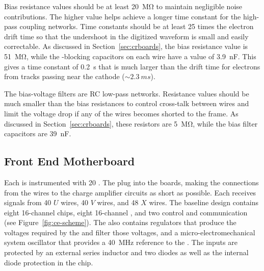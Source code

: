 Bias resistance values should be at least \SI{20}{\mega\ohm} to 
maintain negligible noise contributions. The higher value helps 
achieve a longer time constant for the high-pass coupling networks.
Time constants should be at least \num{25} times the electron 
drift time so that the undershoot in the digitized waveform
is small and easily correctable. %
As discussed in Section~\ref{sec:crboards},
the bias resistance value is \SI{51}{\mega\ohm}, while the 
-blocking capacitors on each wire have a value of
\SI{3.9}{nF}. This gives a time constant of \SI{0.2}{s} that
is much larger than the drift time for electrons from tracks
passing near the cathode ($\sim\SI{2.3}{ms}$).

The bias-voltage filters are RC low-pass networks. Resistance 
values should be much smaller than the bias resistances to control 
cross-talk between wires and limit the voltage drop if any of the 
wires becomes shorted to the  frame. As discussed
in Section~\ref{sec:crboards}, these resistors are 
\SI{5}{\mega\ohm}, while the bias filter capacitors are \SI{39}{nF}.

\subsection{Front End Motherboard}
\label{sec:fdsp-tpcelec-design-femb}

Each  is instrumented with \num{20} .
The  plug into the   boards, 
making the connections from the wires to the charge amplifier 
circuits as short as possible. Each  receives signals 
from \num{40} $U$ wires, \num{40} $V$ wires, and \num{48} $X$ wires.
The baseline  design contains eight \num{16}-channel 
 chips, eight \num{16}-channel 
 , and two  control and 
communication  (see Figure~\ref{fig:ce-scheme}).
The  also contains regulators that produce the voltages 
required by the  and filter those voltages, and 
a micro-electromechanical system oscillator that provides
a \SI{40}{MHz} reference to the  . The  
inputs are protected by an external series inductor and two 
diodes as well as the internal diode protection in the chip.

